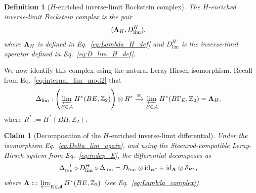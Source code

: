\documentclass[aps,prx,reprint,superscriptaddress,twocolumn,amsmath,amssymb,amsfonts, nofootinbib]{revtex4-2}
\newcommand{\Z}{\mathbb{Z}}
\theoremstyle{apsstyle}
\newtheorem{definition}[theorem]{Definition}
\newtheorem{claim}{Claim}
\begin{document}
\begin{definition}[$H$-enriched inverse-limit Bockstein complex]
\label{def:LambdaH_complex}
The $H$-enriched inverse-limit Bockstein complex is the pair
\begin{equation}
({\bf \Lambda}_{H},D_{\lim}^{H}),
\end{equation}
where ${\bf \Lambda}_{H}$ is defined in Eq.~\eqref{eq:Lambda_H_def} and $D_{\lim}^{H}$ is the inverse-limit operator defined in Eq.~\eqref{eq:D_lim_H_def}.
\end{definition}

\bigskip 

We now identify this complex using the natural Leray-Hirsch isomorphism. Recall from Eq.~\eqref{eq:internal_lim_mod2} that
\begin{equation}
\Delta_{\lim}: \left( \varprojlim_{E\in\mathcal A} H^{*}(BE,\Z_{2}) \right)\otimes R^{*}
\xrightarrow{\cong} \varprojlim_{E\in\mathcal A} H^{*}(B\Gamma_E,\Z_{2}) = {\bf \Lambda}_{H},
\label{eq:Delta_lim_again}
\end{equation}
where $R^{*}:=H^{*}(BH,\Z_{2})$. 

\bigskip 

\begin{claim}[Decomposition of the $H$-enriched inverse-limit differential]
\label{claim:DlimH_decomposition}
Under the isomorphism Eq.~\ref{eq:Delta_lim_again}, and using the Steenrod-compatible Leray-Hirsch system from Eq.~\eqref{eq:indep_E}, the differential decomposes as
\begin{equation}
\Delta_{\lim}^{-1}\circ D_{\lim}^{H}\circ \Delta_{\lim} =
D_{\lim}\otimes \mathrm{id}_{R^{*}} + \mathrm{id}_{{\bf \Lambda}}\otimes \delta_{R^{*}},
\label{eq:DlimH_decomposition}
\end{equation}
where ${\bf \Lambda}:=\varprojlim_{E\in\mathcal A}H^{*}(BE,\Z_{2})$ (see Eq.~\ref{eq:Lambda_complex}).
\end{claim}
\end{document}
